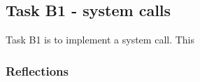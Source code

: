\subsection{Task B1 - system calls}
Task B1 is to implement a system call. This 

\subsubsection{Reflections}
